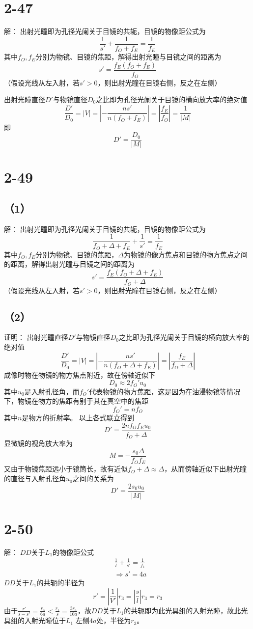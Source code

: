 \documentclass[10pt,a4paper]{article}
\theoremstyle{remark}
\begin{document}
\section*{2-47}解：
出射光瞳即为孔径光阑关于目镜的共轭，目镜的物像距公式为
\[
\frac{1}{s'} + \frac{1}{f_O + f_E} = \frac{1}{f_E}
\]
其中$f_O,f_E$分别为物镜、目镜的焦距，解得出射光瞳与目镜之间的距离为
\[
s' = \frac{f_E(f_O + f_E)}{f_O}
\]
（假设光线从左入射，若$s' > 0$，则出射光瞳在目镜右侧，反之在左侧）

\noindent 出射光瞳直径$D'$与物镜直径$D_0$之比即为孔径光阑关于目镜的横向放大率的绝对值
\[
\frac{D'}{D_0} = |V| = |-\frac{ns'}{n(f_O + f_E)}| = |\frac{f_E}{f_O}| = \frac{1}{|M|}
\]
即
\[
D' = \frac{D_0}{|M|}
\]
\section*{2-49}
\subsection*{（1）}解：
出射光瞳即为孔径光阑关于目镜的共轭，目镜的物像距公式为
\[
\frac{1}{f_O + \Delta + f_E} + \frac{1}{s'} = \frac{1}{f_E}
\]
其中$f_O,f_E$分别为物镜、目镜的焦距，$\Delta$为物镜的像方焦点和目镜的物方焦点之间的距离，解得出射光瞳与目镜之间的距离为
\[
s' = \frac{f_E(f_O + \Delta + f_E)}{f_O + \Delta}
\]
（假设光线从左入射，若$s' > 0$，则出射光瞳在目镜右侧，反之在左侧）
\subsection*{（2）}证明：
\noindent 出射光瞳直径$D'$与物镜直径$D_0$之比即为孔径光阑关于目镜的横向放大率的绝对值
\[
\frac{D'}{D_0} = |V| = |-\frac{ns'}{n(f_O + \Delta + f_E)}| = |\frac{f_E}{f_O + \Delta}|
\]
成像时物在物镜的物方焦点附近，故在傍轴近似下
\[
D_0 \approx 2f_O'u_0
\]
其中$u_0$是入射孔径角，而$f_O'$代表物镜的物方焦距，这是因为在油浸物镜等情况下，物镜在物方的焦距有别于其在真空中的焦距
\[
f_O' = nf_O
\]
其中$n$是物方的折射率。
以上各式联立得到
\[
D' = \frac{2nf_Of_Eu_0}{f_O + \Delta}
\]
显微镜的视角放大率为
\[
M = -\frac{s_0\Delta}{f_Of_E}
\]
又由于物镜焦距远小于镜筒长，故有近似$f_O + \Delta \approx \Delta$，从而傍轴近似下出射光瞳的直径与入射孔径角$u_0$之间的关系为
\[
D' = \frac{2s_0u_0}{|M|}
\]
\section*{2-50}解：
$DD$关于$L_1$的物像距公式
\begin{align*}
&\frac{1}{l} + \frac{1}{s'} = \frac{1}{f_1}\\
&\Longrightarrow s' = 4a
\end{align*}
$DD$关于$L_1$的共轭的半径为
\[
r' = |\frac{1}{V'}|r_3 = |\frac{s}{l}|r_3 = r_3
\]
由于$\frac{r'}{s - s'} = \frac{r_3}{6a} < \frac{r_1}{s} = \frac{3r_3}{10a}$，故$DD$关于$L_1$的共轭即为此光具组的入射光瞳，故此光具组的入射光瞳位于$L_1$ 左侧$4a$处，半径为$r_3$。
\end{document}
